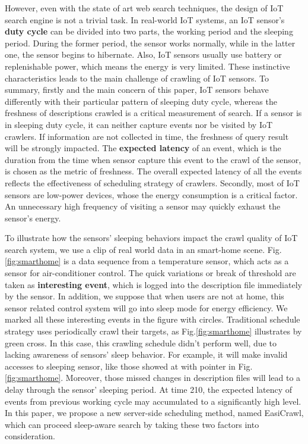 \documentclass[conference]{IEEEtran}
\begin{document}
However, even with the state of art web search techniques, the design of IoT search engine is not a trivial task. 
In real-world IoT systems, an IoT sensor's \textbf{duty cycle} can be divided into two parts, the working period and the sleeping period.
During the former period, the sensor works normally, while in the latter one, the sensor begins to hibernate.
Also, IoT sensors usually use battery or replenishable power, which means the energy is very limited.
These instinctive characteristics leads to the main challenge of crawling of IoT sensors. 
To summary, firstly and the main concern of this paper, IoT sensors behave differently with their particular pattern of sleeping duty cycle, whereas the freshness of descriptions crawled is a critical measurement of search. 
If a sensor is in sleeping duty cycle, it can neither capture events nor be visited by IoT crawlers. 
If information are not collected in time, the freshness of query result will be strongly impacted.
The \textbf{expected latency} of an event, which is the duration from the time when sensor capture this event to the crawl of the sensor, is chosen as the metric of freshness.
The overall expected latency of all the events reflects the effectiveness of scheduling strategy of crawlers.
Secondly, most of IoT sensors are low-power devices, whose the energy consumption is a critical factor. 
An unnecessary high frequency of visiting a sensor may quickly exhaust the sensor's energy.

To illustrate how the sensors' sleeping behaviors impact the crawl quality of IoT search system, we use a clip of real world data in an smart-home scene.
Fig.\ref{fig:smarthome} is a data sequence from a temperature sensor, which acts as a sensor for air-conditioner control. 
The quick variations or break of threshold are taken as \textbf{interesting event}, which is logged into the description file immediately by the sensor.
In addition, we suppose that when users are not at home, this sensor related control system will go into sleep mode for energy efficiency.
We marked all these interesting events in the figure with circles.
Traditional schedule strategy uses periodically crawl their targets, as Fig.\ref{fig:smarthome} illustrates by green cross.
In this case, this crawling schedule didn't perform well, due to lacking awareness of sensors' sleep behavior. 
For example, it will make invalid accesses to sleeping sensor, like those showed at with pointer in Fig.\ref{fig:smarthome}. 
Moreover, those missed changes in description files will lead to a delay through the sensor' sleeping period. 
At time 210, the expected latency of events from previous working cycle may accumulated to a significantly high level.
In this paper, we propose a new server-side scheduling method, named EasiCrawl, which can proceed sleep-aware search by taking these two factors into consideration.
\end{document}
